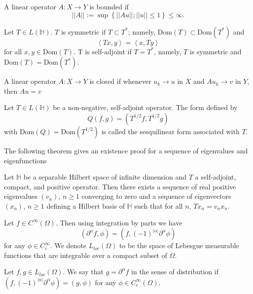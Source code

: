 \begin{definition}
  A linear operator $ A : X \to Y $ is bounded if 
  \[
  || A || := \sup \left\{ || Au ||; || u || \leq 1  \right\} \leq \infty
  .\] 
\end{definition}

\begin{definition}
  Let $T \in L(\mathbb{H})$. $T$ is symmetric if $T \subset T^{*}$; namely, $\text{Dom}(T) \subset \text{Dom}(T^{*})$ and 
  \[
  \left<Tx,y \right> = \left<x,Ty \right>
  \] 
  for all $x,y \in \text{Dom}(T)$. T is self-adjoint if $T = T^{*}$, namely, $T$ is symmetric and $\text{Dom}(T) = \text{Dom}(T^{*})$.
\end{definition}

\begin{definition}
  A linear operator $ A : X \to Y $ is closed if whenever $u_{k} \to u$ in $X$ and $Au_{k} \to v$ in $Y$, then $Au = v$
\end{definition}


\begin{definition}
  Let $T \in L(\mathbb{H})$ be a non-negative, self-adjoint operator. The form defined by
  \[
  Q(f,g) = \left( T^{1 / 2}f,T^{1 / 2}g \right)
  \] 
  with $\text{Dom}(Q) = \text{Dom}(T^{1 / 2})$ is called the sesquilinear form associated with $T$.
\end{definition}

The following theorem gives an existence proof for a sequence of eigenvalues and eigenfunctions\cite{evans}

\begin{theorem} \label{spectrum}
  Let $\mathbb{H}$ be a separable Hilbert space of infinite dimension and $T$ a self-adjoint, compact, and positive operator. 
  Then there exists a sequence of real positive eigenvalues $(v_{n})$, $n \geq 1$ converging to zero and a sequence of eigenvectors $(x_{n})$, $n \geq 1$ defining a Hilbert basis of $\mathbb{H}$ such that for all $n$, $Tx_{n} = v_{n} x_{n}$.
\end{theorem}


Let $f \in C^{\infty}(\Omega)$.
Then using integration by parts we have 
\[
\left( \partial^{\alpha}f, \phi \right) = \left( f, (-1)^{| \alpha |} \partial^{\alpha} \phi \right)
\] 
for any $\phi \in C_{c}^{\infty}$.
We denote $L_{loc}(\Omega)$ to be the space of Lebesgue measurable functions that are integrable over a compact subset of $\Omega$.

\begin{definition}
 Let $f,g \in L_{loc}(\Omega)$. We say that $g = \partial^{\alpha} f$ in the sense of distribution if $\left( f, (-1)^{| \alpha |} \partial^{\alpha} \phi \right) = \left( g,\phi \right)$ for any $\phi \in C_{c}^{\infty}(\Omega)$.
\end{definition}

